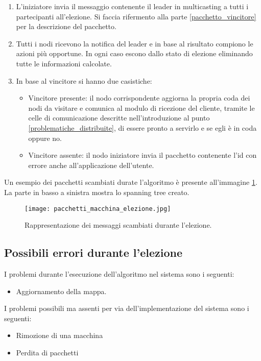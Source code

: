 \begin{enumerate}
	\item L'iniziatore invia il messaggio contenente il leader in multicasting a tutti i partecipanti all'elezione. Si faccia rifermento alla parte \ref{pacchetto_vincitore} per la descrizione del pacchetto.
	\item Tutti i nodi ricevono la notifica del leader e in base al risultato compiono le azioni più opportune. In ogni caso escono dallo stato di elezione eliminando tutte le informazioni calcolate.
	\item In base al vincitore si hanno due casistiche:
		\begin{itemize}
			\item Vincitore presente: il nodo corrispondente aggiorna la propria coda dei nodi da visitare e comunica al modulo di ricezione del cliente, tramite le celle di comunicazione descritte nell'introduzione al punto \ref{problematiche_distribuite}, di essere pronto a servirlo e se egli è in coda oppure no.
			\item Vincitore assente: il nodo iniziatore invia il pacchetto contenente l'id con errore anche all'applicazione dell'utente.
		\end{itemize}
\end{enumerate}

Un esempio dei pacchetti scambiati durate l'algoritmo è presente all'immagine \ref{fig:pacchetti_macchina_elezione}. La parte in basso a sinistra mostra lo spanning tree creato.

\begin{figure}[htbp]
	\centering
	\texttt{[image: pacchetti\_macchina\_elezione.jpg]}
	\caption{Rappresentazione dei messaggi scambiati durante l'elezione.}
	\label{fig:pacchetti_macchina_elezione}
\end{figure}

\newpage

\subsection{Possibili errori durante l'elezione}

I problemi durante l'esecuzione dell'algoritmo nel sistema sono i seguenti:
\begin{itemize}
	\item Aggiornamento della mappa.
\end{itemize}

I problemi possibili ma assenti per via dell'implementazione del sistema sono i seguenti:
\begin{itemize}
	\item Rimozione di una macchina
	\item Perdita di pacchetti
\end{itemize}

